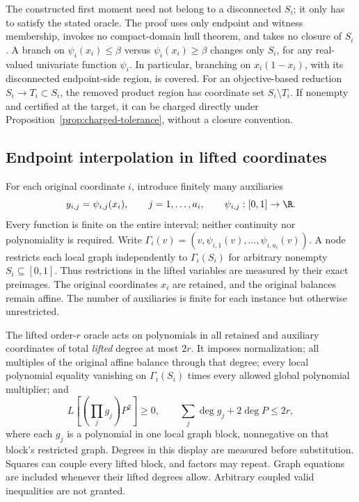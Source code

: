 The constructed first moment need not belong to a disconnected $S_i$;
it only has to satisfy the stated oracle. The proof uses only endpoint and
witness membership, invokes no compact-domain hull theorem, and takes no
closure of $S_i$.
A branch on $\psi_i(x_i)\le\beta$ versus $\psi_i(x_i)\ge\beta$ changes
only $S_i$, for any real-valued univariate function $\psi_i$. In particular,
branching on $x_i(1-x_i)$, with its disconnected endpoint-side region,
is covered. For an objective-based reduction $S_i\to T_i\subset S_i$,
the removed product region has coordinate set $S_i\setminus T_i$.
If nonempty and certified at the target, it can be charged directly under
Proposition~\ref{prop:charged-tolerance}, without a closure convention.

\subsection{Endpoint interpolation in lifted coordinates}
For each original coordinate $i$, introduce finitely many auxiliaries
\begin{equation}\label{eq:local-graph-map}
 y_{i,j}=\psi_{i,j}(x_i),\qquad j=1,\ldots,a_i,
 \qquad \psi_{i,j}:[0,1]\to\R.
\end{equation}
Every function is finite on the entire interval; neither continuity nor
polynomiality is required. Write
$\Gamma_i(v)=(v,\psi_{i,1}(v),\ldots,\psi_{i,a_i}(v))$.
A node restricts each local graph independently to
$\Gamma_i(S_i)$ for arbitrary nonempty $S_i\subseteq[0,1]$.
Thus restrictions in the lifted variables are measured by their exact
preimages. The original coordinates $x_i$ are retained, and the original
balances remain affine. The number of auxiliaries is finite for each
instance but otherwise unrestricted.

The lifted order-$r$ oracle acts on polynomials in all retained and
auxiliary coordinates of total \emph{lifted} degree at most $2r$. It
imposes normalization; all multiples of the original affine balance
through that degree; every local polynomial equality vanishing on
$\Gamma_i(S_i)$ times every allowed global polynomial multiplier; and
\begin{equation}\label{eq:lifted-local-oracle}
 L\left[\left(\prod_j g_j\right)P^2\right]\ge0,
 \qquad\sum_j\deg g_j+2\deg P\le2r,
\end{equation}
where each $g_j$ is a polynomial in one local graph block, nonnegative
on that block's restricted graph. Degrees in this display are measured
before substitution. Squares can couple every lifted block, and factors
may repeat. Graph equations are included whenever their lifted degrees
allow. Arbitrary coupled valid inequalities are not granted.

